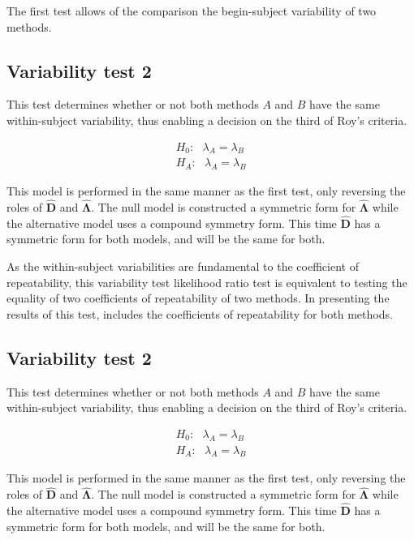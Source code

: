 \documentclass[12pt, a4paper]{report}
\theoremstyle{plain}
\theoremstyle{definition}
\theoremstyle{remark}
\begin{document}
	

	
	
	
	The first test allows of the comparison the begin-subject variability of two methods. 
		\subsection{Variability test 2}
		
		This test determines whether or not both methods $A$ and $B$ have the same within-subject variability, thus enabling a decision on the third of Roy's criteria.
		
		\begin{eqnarray*}
			H_{0}: \mbox{ }\lambda_{A}  = \lambda_{B} \\
			H_{A}: \mbox{ }\lambda_{A}  = \lambda_{B}
		\end{eqnarray*}
		
		This model is performed in the same manner as the first test, only reversing the roles of $\boldsymbol{\hat{D}}$ and $\boldsymbol{\hat{\Lambda}}$. The null model is constructed a symmetric form for $\boldsymbol{\hat{\Lambda}}$ while the alternative model uses a compound symmetry form. This time $\boldsymbol{\hat{D}}$ has a symmetric form for both models, and will be the same for both.
		
		As the within-subject variabilities are fundamental to the coefficient of repeatability, this variability test likelihood ratio test is equivalent to testing the equality of two coefficients of repeatability of two methods. In presenting the results of this test, \citet{roy} includes the coefficients of repeatability for both methods.
		
		
	
	\subsection{Variability test 2}
	
	This test determines whether or not both methods $A$ and $B$ have the same within-subject variability, thus enabling a decision on the third of Roy's criteria.
	
	\begin{eqnarray*}
		H_{0}: \mbox{ }\lambda_{A}  = \lambda_{B} \\
		H_{A}: \mbox{ }\lambda_{A}  = \lambda_{B}
	\end{eqnarray*}
	
	
	This model is performed in the same manner as the first test, only reversing the roles of $\boldsymbol{\hat{D}}$ and $\boldsymbol{\hat{\Lambda}}$. The null model is constructed a symmetric form for $\boldsymbol{\hat{\Lambda}}$ while the alternative model uses a compound symmetry form. This time $\boldsymbol{\hat{D}}$ has a symmetric form for both models, and will be the same for both.
	
\end{document}

